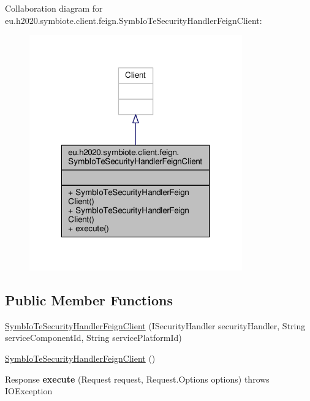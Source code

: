 Collaboration diagram for eu.\+h2020.\+symbiote.\+client.\+feign.\+Symb\+Io\+Te\+Security\+Handler\+Feign\+Client\+:\nopagebreak
\begin{figure}[H]
\begin{center}
\leavevmode
\includegraphics[width=260pt]{classeu_1_1h2020_1_1symbiote_1_1client_1_1feign_1_1SymbIoTeSecurityHandlerFeignClient__coll__graph}
\end{center}
\end{figure}
\subsection*{Public Member Functions}
\begin{DoxyCompactItemize}
\item 
\hyperlink{classeu_1_1h2020_1_1symbiote_1_1client_1_1feign_1_1SymbIoTeSecurityHandlerFeignClient_a3996d6cfc39a16cf76894fb85e9bc14c}{Symb\+Io\+Te\+Security\+Handler\+Feign\+Client} (I\+Security\+Handler security\+Handler, String service\+Component\+Id, String service\+Platform\+Id)
\item 
\hyperlink{classeu_1_1h2020_1_1symbiote_1_1client_1_1feign_1_1SymbIoTeSecurityHandlerFeignClient_a01f094cab352e880e62d24a73e5c4d10}{Symb\+Io\+Te\+Security\+Handler\+Feign\+Client} ()
\item 
\mbox{\label{classeu_1_1h2020_1_1symbiote_1_1client_1_1feign_1_1SymbIoTeSecurityHandlerFeignClient_aa71bfc84345efbd54bba883d0a32fa4e}} 
Response {\bfseries execute} (Request request, Request.\+Options options)  throws I\+O\+Exception 
\end{DoxyCompactItemize}


